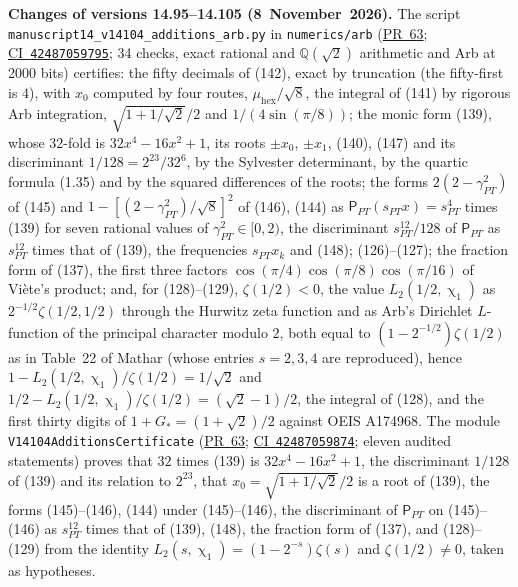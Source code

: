 \documentclass[11pt,a4paper]{article}
\newcommand{\R}{https://github.com/ralfanop/Certifications_Eulerian_polar-curve_computations}
\newcommand{\PR}[1]{\href{\R/pull/#1}{PR~#1}}
\newcommand{\CI}[1]{\href{\R/actions/runs/#1}{CI~\texttt{#1}}}
\newcommand{\eq}[1]{(#1)}
\begin{document}
\textbf{Changes of versions 14.95--14.105 (8~November~2026).} The script \texttt{manuscript14\_\allowbreak v14104\_\allowbreak additions\_\allowbreak arb.py} in \texttt{numerics/\allowbreak arb} (\PR{63}; \CI{42487059795}; 34 checks, exact rational and $\mathbb Q(\sqrt2)$ arithmetic and Arb at 2000 bits) certifies: the fifty decimals of \eq{142}, exact by truncation (the fifty-first is $4$), with $x_0$ computed by four routes, $\mu_{\mathrm{hex}}/\sqrt8$, the integral of \eq{141} by rigorous Arb integration, $\sqrt{1+1/\sqrt2}/2$ and $1/(4\sin(\pi/8))$; the monic form \eq{139}, whose $32$-fold is $32x^4-16x^2+1$, its roots $\pm x_0$, $\pm x_1$, \eq{140}, \eq{147} and its discriminant $1/128=2^{23}/32^6$, by the Sylvester determinant, by the quartic formula (1.35) and by the squared differences of the roots; the forms $2(2-\gamma_{\mathit{PT}}^2)$ of \eq{145} and $1-[(2-\gamma_{\mathit{PT}}^2)/\sqrt8]^2$ of \eq{146}, \eq{144} as $\mathsf P_{\mathit{PT}}(s_{\mathit{PT}}x)=s_{\mathit{PT}}^4$ times \eq{139} for seven rational values of $\gamma_{\mathit{PT}}^2\in[0,2)$, the discriminant $s_{\mathit{PT}}^{12}/128$ of $\mathsf P_{\mathit{PT}}$ as $s_{\mathit{PT}}^{12}$ times that of \eq{139}, the frequencies $s_{\mathit{PT}}x_k$ and \eq{148}; \eq{126}--\eq{127}; the fraction form of \eq{137}, the first three factors $\cos(\pi/4)\cos(\pi/8)\cos(\pi/16)$ of Vi\`ete's product; and, for \eq{128}--\eq{129}, $\zeta(1/2)<0$, the value $L_2(1/2,\upchi_1)$ as $2^{-1/2}\zeta(1/2,1/2)$ through the Hurwitz zeta function and as Arb's Dirichlet $L$-function of the principal character modulo $2$, both equal to $(1-2^{-1/2})\zeta(1/2)$ as in Table~22 of Mathar (whose entries $s=2,3,4$ are reproduced), hence $1-L_2(1/2,\upchi_1)/\zeta(1/2)=1/\sqrt2$ and $1/2-L_2(1/2,\upchi_1)/\zeta(1/2)=(\sqrt2-1)/2$, the integral of \eq{128}, and the first thirty digits of $1+G_*=(1+\sqrt2)/2$ against OEIS A174968. The module \texttt{V14104AdditionsCertificate} (\PR{63}; \CI{42487059874}; eleven audited statements) proves that $32$ times \eq{139} is $32x^4-16x^2+1$, the discriminant $1/128$ of \eq{139} and its relation to $2^{23}$, that $x_0=\sqrt{1+1/\sqrt2}/2$ is a root of \eq{139}, the forms \eq{145}--\eq{146}, \eq{144} under \eq{145}--\eq{146}, the discriminant of $\mathsf P_{\mathit{PT}}$ on \eq{145}--\eq{146} as $s_{\mathit{PT}}^{12}$ times that of \eq{139}, \eq{148}, the fraction form of \eq{137}, and \eq{128}--\eq{129} from the identity $L_2(s,\upchi_1)=(1-2^{-s})\zeta(s)$ and $\zeta(1/2)\neq0$, taken as hypotheses.
\end{document}
